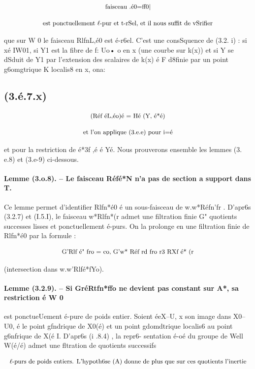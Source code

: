 \documentclass[11pt]{article}
\theoremstyle{remark}
\begin{document}
\[\text{\small faisceau .é0=ff0|}\]

\[\text{\small est ponctuellement \(\ell\)-pur et t-rSel, et il nous suffit de vSrifier}\]

que sur W 0 le faisceau RlfnL,é0 est é-r6el. C'est une consSquence de (3.2. i) : si xé IW01, si Y1 est la fibre de f: Uo• o en x (une courbe sur k(x)) et si Y se dSduit de Y1 par l'extension des scalaires de k(x) é F d8finie par un point g6omgtrique K localis8 en x, ona:

\subsection*{(3.é.7.x)}

\[\text{\small (Réf éL,éo)é = Hé (Y, é*é)}\]

\[\text{\small et l'on applique (3.e.e) pour i=é}\]

et pour la restriction de é*3f ,é é Yé. Nous prouverons ensemble les lemmes (3. e.8) et (3.e-9) ci-dessous.

\paragraph{Lemme (3.o.8). -- Le faisceau Réfé*N n'a pas de section a support dans T.}

Ce lemme permet d'identifier Rlfn*é0 é un sous-faisceau de w.w*Réfn'fr . D'apr6s (3.2.7) et (I.5.I), le faisceau w*Rlfn*(r admet une filtration finie G" quotients successes lisses et ponctuellement é-purs. On la prolonge en une filtration finie de Rlfn*é0 par la formule :

\[\text{\small G'Rlf é" fro = co, G'w* Réf rd fro r3 RXf é* (r}\]

(intersection dans w.w'Rlfé*fYo).

\paragraph{Lemme (3.2.9). -- Si GréRtfn*ffo ne devient pas constant sur A*, sa restriction é W 0}

est ponctueUement é-pure de poids entier. Soient éeX--U, x son image dans X0--U0, é le point gfndrique de X0(é) et un point gdomdtrique localis6 au point g6nfrique de X(é I. D'apr6s (i .8.4) , la repr6- sentation é-oé du groupe de Well W(é/é) admet une fltration de quotients successifs

\[\text{\small \(\ell\)-purs de poids entiers. L'hypoth6se (A) donne de plus que sur ces quotients l'inertie}\]
\end{document}
